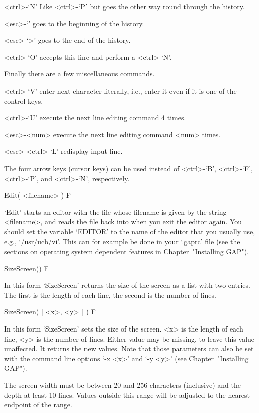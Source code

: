<ctrl>-`N' Like <ctrl>-`P' but goes the other way round through the
  history.

<esc>-`\<' goes to the beginning of the history.

<esc>-`>' goes to the end of the history.

<ctrl>-`O' accepts this line and perform a <ctrl>-`N'.

Finally there are a few miscellaneous commands.

<ctrl>-`V' enter next character literally, i.e., enter it even if it
  is one of the control keys.

<ctrl>-`U' execute the next line editing command 4 times.

<esc>-<num> execute the next line editing command <num> times.

<esc>-<ctrl>-`L' redisplay input line.

The four arrow keys (cursor keys) can be used instead of <ctrl>-`B',
<ctrl>-`F', <ctrl>-`P', and <ctrl>-`N', respectively.


\>Edit( <filename> ) F

`Edit' starts an editor with the file whose filename is given by the
string <filename>, and reads the file back into {\GAP} when you exit the
editor again. You should set the {\GAP} variable `EDITOR' to the name of
the editor that you usually use, e.g., `/usr/ucb/vi'. This can for
example be done in your `.gaprc' file (see the sections on operating
system dependent features in Chapter~"Installing GAP").


\>SizeScreen() F

In this form `SizeScreen' returns the size of the screen as a list with
two entries. The first is the length of each line, the second is the
number of lines.

\>SizeScreen( [ <x>, <y> ] ) F

In this form `SizeScreen' sets the size of the screen. <x> is the
length of each line, <y> is the number of lines. Either value may be
missing, to leave this value unaffected. It returns the new
values. Note that those parameters can also be set with the command
line options `-x <x>' and `-y <y>' (see Chapter~"Installing GAP").

The screen width must be between 20 and 256 characters (inclusive) and 
the depth at least 10 lines. Values outside this range will be
adjusted to the nearest endpoint of the range.



